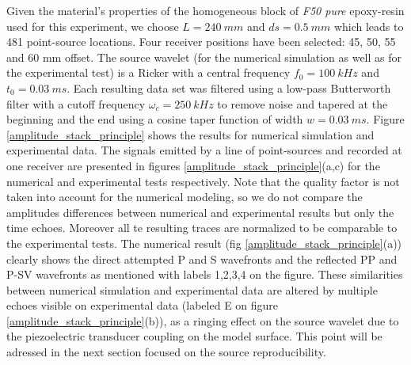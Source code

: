 \documentclass[manuscript,revised]{geophysics}
\begin{document}
\noindent Given the material's properties of the homogeneous block of \textit{F50 pure} epoxy-resin used for this experiment, we choose $L=240\ mm$ and $ds=0.5\ mm$ which leads to 481 point-source locations. Four receiver positions have been selected: 45, 50, 55 and 60 mm offset. The source wavelet (for the numerical simulation as well as for the experimental test) is a Ricker with a central frequency $f_{0}=100\ kHz$ and $t_{0}=0.03\ ms$. Each resulting data set was filtered using a low-pass Butterworth filter with a cutoff frequency $\omega_{c}=250\ kHz$ to remove noise and tapered at the beginning and the end using a cosine taper function of width $w=0.03\ ms$. Figure \ref{amplitude_stack_principle} shows the results for numerical simulation and experimental data. The signals emitted by a line of point-sources and recorded at one receiver are presented in figures \ref{amplitude_stack_principle}(a,c) for the numerical and experimental tests respectively.  Note that the quality factor is not taken into account for the numerical modeling, so we do not compare the amplitudes differences between numerical and experimental results but only the time echoes. Moreover all te resulting traces are normalized to be comparable to the experimental tests. The numerical result (fig \ref{amplitude_stack_principle}(a)) clearly shows the direct attempted P and S wavefronts and the reflected PP and P-SV wavefronts as mentioned with labels 1,2,3,4 on the figure. These similarities between numerical simulation and experimental data are altered by multiple echoes visible on experimental data (labeled E on figure \ref{amplitude_stack_principle}(b)), as a ringing effect on the source wavelet due to the piezoelectric transducer coupling on the model surface. This point will be adressed in the next section focused on the source reproducibility.   
\end{document}
